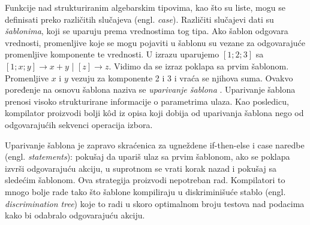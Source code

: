  
Funkcije nad strukturiranim algebarskim tipovima, kao što su liste, mogu se definisati preko različitih slučajeva (engl. \textit{case}). Različiti slučajevi dati su \textit{šablonima}, koji se uparuju prema vrednostima tog tipa. Ako šablon odgovara vrednosti, promenljive koje se mogu pojaviti u šablonu su vezane za odgovarajuće promenljive komponente te vrednosti. U izrazu uparujemo $[1; 2; 3]$  sa $[1; x; y] \longrightarrow x+y$ |  $[z] \longrightarrow z$. Vidimo da se izraz poklapa sa prvim šablonom. Promenljive $x$ i $y$ vezuju za komponente 2 i 3 i vraća se njihova suma. Ovakvo poređenje na osnovu šablona naziva se \textit{uparivanje šablona} \cite{compiler-design, compiling-fl}. Uparivanje šablona prenosi visoko strukturirane informacije o parametrima ulaza. Kao posledicu, kompilator proizvodi bolji k\^ od iz opisa koji dobija od uparivanja šablona nego od odgovarajućih sekvenci operacija izbora. %

Uparivanje šablona je zapravo skraćenica za ugneždene if-then-else i case naredbe (engl. \textit{statements}): pokušaj da upariš ulaz sa prvim šablonom, ako se poklapa izvrši odgovarajuću akciju, u suprotnom se vrati korak nazad i pokušaj sa sledećim šablonom. Ova strategija proizvodi nepotreban rad. Kompilatori to mnogo bolje rade tako što šablone kompiliraju u diskriminišuće stablo (engl. \textit{discrimination tree}) koje to radi u skoro optimalnom broju testova nad podacima kako bi odabralo odgovarajuću akciju. 
